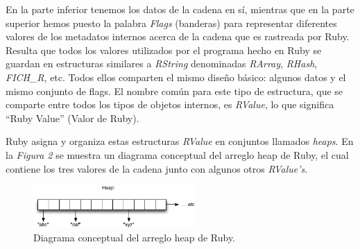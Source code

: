 \documentclass{article}
\begin{document}
\noindent En la parte inferior tenemos los datos de la cadena en sí, mientras que en la parte superior hemos puesto la palabra \textit{Flags} (banderas) para representar diferentes valores de los metadatos internos acerca de la cadena que es rastreada por Ruby. Resulta que todos los valores utilizados por el programa hecho en Ruby se guardan en estructuras similares a \textit{RString} denominadas \textit{RArray}, \textit{RHash}, \textit{FICH\_R}, etc. Todos ellos comparten el mismo diseño básico: algunos datos y el mismo conjunto de flags. El nombre común para este tipo de estructura, que se comparte entre todos los tipos de objetos internos, es \textit{RValue}, lo que significa ``Ruby Value'' (Valor de Ruby).
	\par
	Ruby asigna y organiza estas estructuras \textit{RValue} en conjuntos llamados \textit{heaps}. En la \textit{Figura 2} se muestra un diagrama conceptual del arreglo heap de Ruby, el cual contiene los tres valores de la cadena junto con algunos otros \textit{RValue's}.
\bigskip

\begin{figure}[h]
	\centering
	\includegraphics[width=0.55\textwidth]{images/gc/gc02-heap.png}
	\caption{Diagrama conceptual del arreglo heap de Ruby.}
\end{figure}
\bigskip
\end{document}
